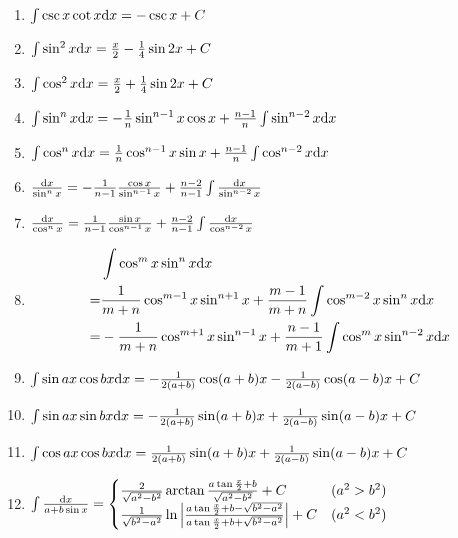 \begin{tiny}
\begin{enumerate}[noitemsep]
\item $ \int \csc x \cot x \mathrm{d} x = -\csc x + C $

\item $ \int \sin^2 x \mathrm{d} x = \frac{x}{2} - \frac{1}{4} \sin 2x + C $

\item $ \int \cos^2 x \mathrm{d} x = \frac{x}{2} + \frac{1}{4} \sin 2x + C $

\item $ \int \sin^n x \mathrm{d} x = -\frac{1}{n} \sin^{n-1} x \cos x + \frac{n-1}{n} \int \sin^{n-2} x \mathrm{d} x $

\item $ \int \cos^n x \mathrm{d} x = \frac{1}{n} \cos^{n-1} x \sin x + \frac{n-1}{n} \int \cos^{n-2} x \mathrm{d} x $

\item $ \frac{\mathrm{d} x}{\sin^n x} = -\frac{1}{n-1} \frac{\cos x}{\sin^{n-1}x} + \frac{n-2}{n-1} \int \frac{\mathrm{d} x}{\sin^{n-2}x} $

\item $ \frac{\mathrm{d} x}{\cos^n x} = \frac{1}{n-1} \frac{\sin x}{\cos^{n-1}x} + \frac{n-2}{n-1} \int \frac{\mathrm{d} x}{\cos^{n-2}x} $

\item \[ \begin{split} {} & \int \cos^m x \sin^n x \mathrm{d} x \\
	= & \frac{1}{m+n} \cos^{m-1} x \sin^{n+1}x + \frac{m-1}{m+n}\int\cos^{m-2}x\sin^nx\mathrm{d} x \\
	= & -\frac{1}{m+n} \cos^{m+1} x \sin^{n-1}x + \frac{n-1}{m+1} \int \cos^m x\sin^{n-2} x \mathrm{d} x \end{split} \]

\item $ \int \sin ax \cos bx \mathrm{d} x = -\frac{1}{2(a+b)}\cos(a+b)x - \frac{1}{2(a-b)}\cos(a-b)x + C $

\item $ \int \sin ax \sin bx \mathrm{d} x = -\frac{1}{2(a+b)}\sin(a+b)x + \frac{1}{2(a-b)}\sin(a-b)x + C $

\item $ \int \cos ax \cos bx \mathrm{d} x =  \frac{1}{2(a+b)}\sin(a+b)x + \frac{1}{2(a-b)}\sin(a-b)x + C $

\item $ \int \frac{\mathrm{d} x}{a + b \sin x} = \begin{cases}
\frac{2}{\sqrt{a^2-b^2}}\arctan\frac{a\tan\frac{x}{2}+b}{\sqrt{a^2-b^2}} + C & (a^2 > b^2) \\
\frac{1}{\sqrt{b^2-a^2}}\ln \left| \frac{a\tan\frac{x}{2}+b-\sqrt{b^2-a^2}}{a\tan\frac{x}{2}+b+\sqrt{b^2-a^2}} \right| + C & (a^2 < b^2)
\end{cases} $


\end{enumerate}
\end{tiny}
